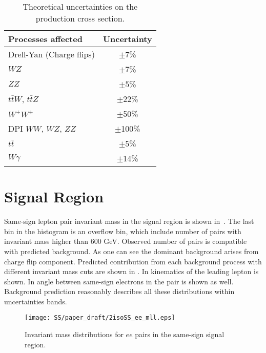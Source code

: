 \begin{table}[ht]
\caption{Theoretical uncertainties on the production cross section.}
\begin{center}
\begin{tabular}{l|c}
Processes affected & Uncertainty \\
\hline
 Drell-Yan (Charge flips) & $\pm$7\% \\
 $WZ$ & $\pm$7\% \\
 $ZZ$ & $\pm$5\% \\
 $t\bar{t}W$, $t\bar{t}Z$  & $\pm$22\% \\
 $W^{\pm}W^{\pm}$ & $\pm$50\% \\
 DPI $WW$, $WZ$, $ZZ$ & $\pm$100\% \\
 $t\bar{t}$ & $\pm$5\% \\
 $W\gamma$ & $\pm$14\% \\
\end{tabular}
\end{center}
\label{tab:systematics_common}
\end{table}



\section{Signal Region}
\label{sec:ss_signalRegion}

Same-sign lepton pair invariant mass in the signal region is shown in~.
The last bin in the histogram is an overflow bin, which include number of pairs with invariant mass higher than 600 GeV.
Observed number of pairs is compatible with predicted background.
As one can see the dominant background arises from charge flip component.
Predicted contribution from each background process with different invariant mass cuts are shown in .
In  kinematics of the leading lepton is shown. 
In  angle between same-sign electrons in the pair is shown as well.
Background prediction reasonably describes all these distributions within uncertainties bands.


\begin{figure}[h]
\begin{center}
\texttt{[image: SS/paper\_draft/2isoSS\_ee\_mll.eps]}
\caption{\toDo Invariant mass distributions for $ee$ pairs in the same-sign signal region.}
\label{fig:signal_mass}
\end{center}
\end{figure}

